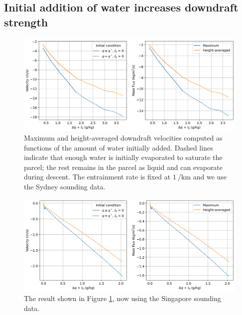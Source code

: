 \documentclass[12pt,titlepage]{article}
\begin{document}
\clearpage
\subsection{Initial addition of water increases downdraft strength}

\begin{figure}[ht]
	\centering
	\includegraphics[width=0.8\linewidth]
		{figures/20211026_experiments_sydney/initial_conditions_vs_velocity}
	\caption{
		Maximum and height-averaged downdraft velocities computed as
		functions of the amount of water initially added. Dashed lines
		indicate that enough water is initially evaporated to saturate
		the parcel; the rest remains in the parcel as liquid and can
		evaporate during descent. The entrainment rate is fixed at
		$\SI{1}{\per\kilo\meter}$ and we use the Sydney sounding data.}
	\label{sydney_initial_conditions_vs_velocity}
\end{figure}

\begin{figure}[ht]
	\centering
	\includegraphics[width=0.8\linewidth]
		{figures/20211027_experiments_singapore/initial_conditions_vs_velocity}
	\caption{
		The result shown in Figure \ref{sydney_initial_conditions_vs_velocity},
		now using the Singapore sounding data.}
	\label{singapore_initial_conditions_vs_velocity}
\end{figure}

\end{document}
